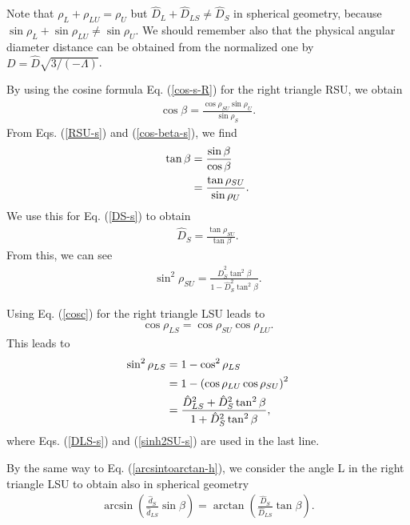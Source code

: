 \documentclass[twocolumn,showpacs,preprintnumbers,amsmath,amssymb]{revtex4-1}
\begin{document}
Note that $\rho_L + \rho_{LU} = \rho_U$ but 
$\hat D_L + \hat D_{LS} \neq \hat D_S$ in spherical geometry, 
because 
$\sin\rho_L + \sin\rho_{LU} \neq \sin\rho_U$. 
We should remember also that 
the physical angular diameter distance can be obtained 
from the normalized one by 
$D = \hat D \sqrt{3/(-\Lambda)}$.  



By using the cosine formula Eq. (\ref{cos-s-R}) 
for the right triangle RSU, 
we obtain 
\begin{align}
\cos\beta 
= 
\frac{\cos \rho_{SU}\sin\rho_U}{\sin\rho_S} .
\label{cos-beta-s}
\end{align}
From Eqs. (\ref{RSU-s}) and (\ref{cos-beta-s}), 
we find 
\begin{align}
\tan\beta 
&=
\frac{\sin\beta}{\cos\beta}
\notag\\
&=
\frac{\tan\rho_{SU}}{\sin\rho_U} . 
\label{tanbeta-s}
\end{align}
We use this for Eq. (\ref{DS-s}) to obtain 
\begin{align}
\hat D_S 
= 
\frac{\tan\rho_{SU}}{\tan\beta} .
\end{align}
From this, we can see 
\begin{align}
\sin^2\rho_{SU} 
=
\frac{\hat D_S^2 \tan^2\beta}{1 - \hat D_S^2 \tan^2\beta} . 
\label{sinh2SU-s}
\end{align}


Using Eq. (\ref{cosc}) for the right triangle LSU 
leads to 
\begin{align}
\cos\rho_{LS} = \cos\rho_{SU} \cos\rho_{LU} . 
\label{cosLS}
\end{align}
This leads to 
\begin{align}
\sin^2\rho_{LS} 
&=
1 - \cos^2\rho_{LS} 
\notag\\
&=
1 - \left(\cos\rho_{LU} \cos\rho_{SU}\right)^2 
\notag\\
&=
\frac{\hat D_{LS}^2 + \hat D_S^2 \tan^2\beta}
{1 + \hat D_S^2 \tan^2\beta} ,
\label{sin2LS}
\end{align}
where Eqs. (\ref{DLS-s}) and (\ref{sinh2SU-s}) are 
used in the last line. 

By the same way to Eq. (\ref{arcsintoarctan-h}), 
we consider the angle L in the right triangle LSU to obtain 
also in spherical geometry 
\begin{align}
\arcsin
\left(
\frac{\hat d_S}{\hat d_{LS}} \sin\beta 
\right)
=
\arctan
\left(
\frac{\hat D_S}{\hat D_{LS}} \tan\beta 
\right) .
\label{arcsintoarctan-s}
\end{align}
\end{document}
